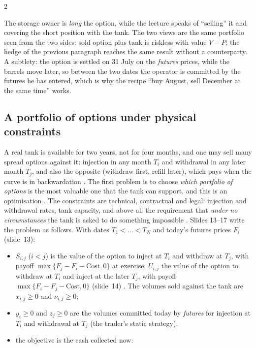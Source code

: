 \begin{paracol}{2}
\begin{remark}
The storage owner is \emph{long} the option, while the lecture speaks of ``selling'' it and covering the short position with the tank. The two views are the same portfolio seen from the two sides: sold option plus tank is riskless with value $V-P$; the hedge of the previous
paragraph reaches the same result without a counterparty. A subtlety: the option is settled on 31 July on the \emph{futures} prices, while the barrels move later, so between the two dates the operator is committed by the futures he has entered, which is why the recipe ``buy August, sell December at the same time'' works.
\end{remark}

\subsection{A portfolio of options under physical constraints}\label{ch21:sec-portfolio}
A real tank is available for two years, not for four months, and one may sell many spread options against it: injection in any month $T_i$ and withdrawal in any later month $T_j$, and also the opposite (withdraw first, refill later), which pays when the curve is
in backwardation . The first problem is to choose \emph{which portfolio of options} is the most valuable one that the tank can support, and this is an optimisation . The constraints are
technical, contractual and legal: injection and withdrawal rates, tank capacity, and above all the requirement that \emph{under no circumstances} the tank is asked to do something impossible . Slides 13--17 write the problem
as follows. With dates $T_1<\dots<T_N$ and today's futures prices $F_i$ (slide~13):
\begin{itemize}
  \item $S_{i,j}$ ($i<j$) is the value of the option to inject at $T_i$ and withdraw at $T_j$, with payoff $\max\{F_j-F_i-\mathrm{Cost},0\}$ at exercise; $U_{i,j}$ the value of the option to withdraw at $T_i$ and inject at the later
        $T_j$, with payoff $\max\{F_i-F_j-\mathrm{Cost},0\}$ (slide~14) . The volumes sold against the tank are $x_{i,j}\ge0$ and $\nu_{i,j}\ge0$;
  \item $y_i\ge0$ and $z_j\ge0$ are the volumes committed today by \emph{futures} for injection at $T_i$ and withdrawal at $T_j$ (the trader's static strategy);
  \item the objective is the cash collected now:
\begin{equation}\label{ch21:eq-storage-obj}

\end{equation}
\end{itemize}
\end{paracol}
